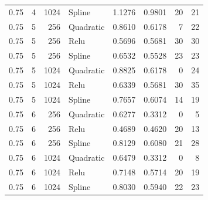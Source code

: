\begin{longtable}{rrrlrrrr}
0.75 & 4 & 1024 & Spline & 1.1276 & 0.9801 & 20 & 21 \\
0.75 & 5 & 256 & Quadratic & 0.8610 & 0.6178 & 7 & 22 \\
0.75 & 5 & 256 & Relu & 0.5696 & 0.5681 & 30 & 30 \\
0.75 & 5 & 256 & Spline & 0.6532 & 0.5528 & 23 & 23 \\
0.75 & 5 & 1024 & Quadratic & 0.8825 & 0.6178 & 0 & 24 \\
0.75 & 5 & 1024 & Relu & 0.6339 & 0.5681 & 30 & 35 \\
0.75 & 5 & 1024 & Spline & 0.7657 & 0.6074 & 14 & 19 \\
0.75 & 6 & 256 & Quadratic & 0.6277 & 0.3312 & 0 & 5 \\
0.75 & 6 & 256 & Relu & 0.4689 & 0.4620 & 20 & 13 \\
0.75 & 6 & 256 & Spline & 0.8129 & 0.6080 & 21 & 28 \\
0.75 & 6 & 1024 & Quadratic & 0.6479 & 0.3312 & 0 & 8 \\
0.75 & 6 & 1024 & Relu & 0.7148 & 0.5714 & 20 & 19 \\
0.75 & 6 & 1024 & Spline & 0.8030 & 0.5940 & 22 & 23 \\
\bottomrule\end{longtable}
